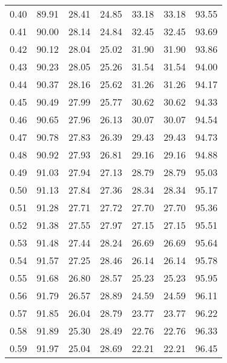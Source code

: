 \begin{tabular}{|c|c|c|c|c|c|c|}
      0.40 &     89.91 &     28.41 &      24.85 &   33.18 &      33.18 &         93.55 \\
      0.41 &     90.00 &     28.14 &      24.84 &   32.45 &      32.45 &         93.69 \\
      0.42 &     90.12 &     28.04 &      25.02 &   31.90 &      31.90 &         93.86 \\
      0.43 &     90.23 &     28.05 &      25.26 &   31.54 &      31.54 &         94.00 \\
      0.44 &     90.37 &     28.16 &      25.62 &   31.26 &      31.26 &         94.17 \\
      0.45 &     90.49 &     27.99 &      25.77 &   30.62 &      30.62 &         94.33 \\
      0.46 &     90.65 &     27.96 &      26.13 &   30.07 &      30.07 &         94.54 \\
      0.47 &     90.78 &     27.83 &      26.39 &   29.43 &      29.43 &         94.73 \\
      0.48 &     90.92 &     27.93 &      26.81 &   29.16 &      29.16 &         94.88 \\
      0.49 &     91.03 &     27.94 &      27.13 &   28.79 &      28.79 &         95.03 \\
      0.50 &     91.13 &     27.84 &      27.36 &   28.34 &      28.34 &         95.17 \\
      0.51 &     91.28 &     27.71 &      27.72 &   27.70 &      27.70 &         95.36 \\
      0.52 &     91.38 &     27.55 &      27.97 &   27.15 &      27.15 &         95.51 \\
      0.53 &     91.48 &     27.44 &      28.24 &   26.69 &      26.69 &         95.64 \\
      0.54 &     91.57 &     27.25 &      28.46 &   26.14 &      26.14 &         95.78 \\
      0.55 &     91.68 &     26.80 &      28.57 &   25.23 &      25.23 &         95.95 \\
      0.56 &     91.79 &     26.57 &      28.89 &   24.59 &      24.59 &         96.11 \\
      0.57 &     91.85 &     26.04 &      28.79 &   23.77 &      23.77 &         96.22 \\
      0.58 &     91.89 &     25.30 &      28.49 &   22.76 &      22.76 &         96.33 \\
      0.59 &     91.97 &     25.04 &      28.69 &   22.21 &      22.21 &         96.45 \\

\end{tabular}

